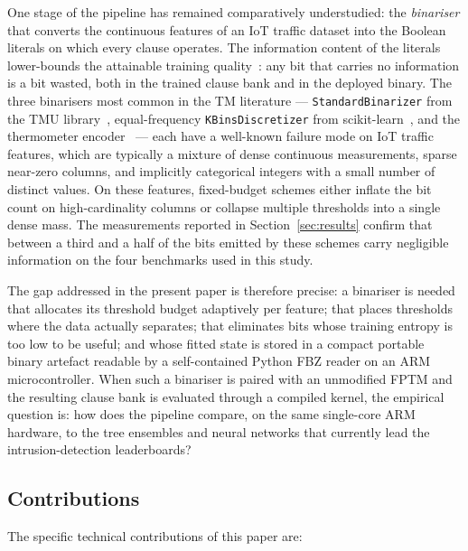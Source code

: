 \documentclass[journal,10pt]{IEEEtran}
\begin{document}
One stage of the pipeline has remained comparatively understudied:
the \emph{binariser} that converts the continuous features of an
IoT traffic dataset into the Boolean literals on which every clause
operates. The information content of the literals lower-bounds the
attainable training quality~\cite{abeyrathna2019continuous,
abeyrathna2021adaptive}: any bit that carries no information is a bit
wasted, both in the trained clause bank and in the deployed binary.
The three binarisers most common in the TM literature ---
\texttt{StandardBinarizer} from the TMU
library~\cite{cair2024tmu,abeyrathna2021adaptive},
equal-frequency \texttt{KBinsDiscretizer} from
scikit-learn~\cite{pedregosa2011scikit}, and the thermometer
encoder~\cite{buckman2018thermometer} --- each have a well-known
failure mode on IoT traffic features, which are typically a mixture
of dense continuous measurements, sparse near-zero columns, and
implicitly categorical integers with a small number of distinct
values. On these features, fixed-budget schemes either inflate the
bit count on high-cardinality columns or collapse multiple thresholds
into a single dense mass. The measurements reported in
Section~\ref{sec:results} confirm that between a third and a half of
the bits emitted by these schemes carry negligible information on the
four benchmarks used in this study.

The gap addressed in the present paper is therefore precise: a
binariser is needed that allocates its threshold budget adaptively per
feature; that places thresholds where the data actually separates;
that eliminates bits whose training entropy is too low to be useful;
and whose fitted state is stored in a compact portable binary artefact
readable by a self-contained Python FBZ reader on an ARM microcontroller.
When such a binariser is paired with an unmodified FPTM and the
resulting clause bank is evaluated through a compiled kernel, the
empirical question is: how does the pipeline compare, on the same
single-core ARM hardware, to the tree ensembles and neural networks
that currently lead the intrusion-detection leaderboards?

\subsection{Contributions}
\label{sec:contrib}

The specific technical contributions of this paper are:
\end{document}
